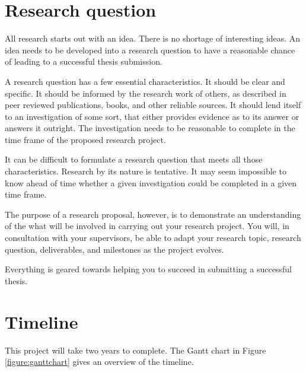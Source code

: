   \section{Research question}
    All research starts out with an idea. There is no shortage of interesting 
    ideas. An idea needs to be developed into a research question to have a
    reasonable chance of leading to a successful thesis submission.
    
    A research question has a few essential characteristics. It should be clear 
    and specific. It should be informed by the research work of others, as
    described in peer reviewed publications, books, and other reliable sources.
    It should lend itself to an investigation of some sort, that either provides
    evidence as to its answer or answers it outright. The investigation needs to
    be reasonable to complete in the time frame of the proposed research project.

    It can be difficult to formulate a research question that meets all those
    characteristics. Research by its nature is tentative. It may seem impossible
    to know ahead of time whether a given investigation could be completed in a
    given time frame.
    
    The purpose of a research proposal, however, is to demonstrate an
    understanding of the what will be involved in carrying out your research
    project. You will, in consultation with your supervisors, be able to adapt
    your research topic, research question, deliverables, and milestones as the
    project evolves.

    Everything is geared towards helping you to succeed in submitting a
    successful thesis.


  \section{Timeline}
    This project will take two years to complete. The Gantt chart in Figure
    \ref{figure:ganttchart} gives an overview of the timeline.

